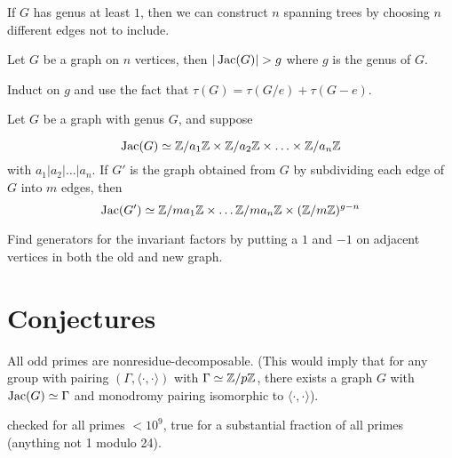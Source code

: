 \documentclass{amsart}
\newenvironment{proof_short}
{\emph{Proof idea:}}
\newenvironment{evidence}
{\emph{Evidence:}}
\begin{document}
\begin{proof_short}
  If $G$ has genus at least $1$, then we can construct $n$ spanning
  trees by choosing $n$ different edges not to include.
\end{proof_short}

\begin{fact}
  Let $G$ be a graph on $n$ vertices, then $|\Jac(G)|>g$ where $g$ is 
  the genus of $G$.
\end{fact}

\begin{proof_short}
  Induct on $g$ and use the fact that $\tau(G) = \tau(G/e) +
  \tau(G-e)$.  
\end{proof_short}


\begin{fact}
  Let $G$ be a graph with genus $G$, and suppose

  \begin{equation}
    \operatorname{Jac}(G) \simeq
    \mathbb{Z}/a_1\mathbb{Z} \times \mathbb{Z}/a_2\mathbb{Z} \times \ldots \times \mathbb{Z}/a_n\mathbb{Z}
  \end{equation}
  with $a_1 | a_2 | \ldots | a_n$. If $G'$ is the graph obtained from
  $G$ by subdividing each edge of $G$ into $m$ edges, then
  \begin{equation}
    \operatorname{Jac}(G') \simeq \mathbb{Z}/ma_1\mathbb{Z} \times \ldots \mathbb{Z}/ma_n\mathbb{Z}
    \times (\mathbb{Z}/m\mathbb{Z})^{g - n}
  \end{equation}
\end{fact}
\begin{proof_short}
  Find generators for the invariant factors by putting a $1$ and $-1$
  on adjacent vertices in both the old and new graph.
\end{proof_short}


\section{Conjectures}


\begin{conj}
  All odd primes are nonresidue-decomposable. (This would imply that
  for any group with pairing $(\Gamma, \langle \cdot , \cdot \rangle)$
  with $\Gamma \simeq \mathbb{Z}/p\mathbb{Z}$, there exists a graph $G$ with $\operatorname{Jac}(G)
  \simeq \Gamma$ and monodromy pairing isomorphic to $\langle \cdot,
  \cdot \rangle$).
\end{conj}
\begin{evidence}
  checked for all primes $ < 10^9$, true for a substantial fraction of
  all primes (anything not 1 modulo 24).
\end{evidence}
\end{document}
